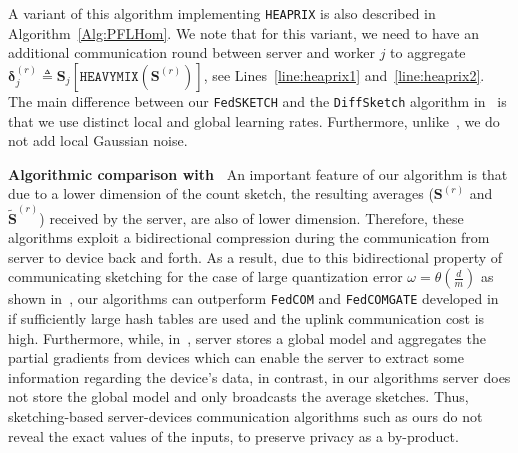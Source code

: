 \documentclass[11pt]{article}
\begin{document}
A variant of this algorithm implementing \texttt{HEAPRIX} is also described in Algorithm~\ref{Alg:PFLHom}. 
We note that for this variant, we need to have an additional communication round between server and worker $j$ to aggregate $\mathbf{\delta}_j^{(r)}\triangleq \mathbf{S}_j\left[\texttt{HEAVYMIX}(\mathbf{S}^{(r)})\right]$, see Lines~\ref{line:heaprix1} and~\ref{line:heaprix2}. The main difference between our \texttt{FedSKETCH} and the \texttt{DiffSketch} algorithm in~\citet{li2019privacy} is that we use distinct local and global learning rates. Furthermore, unlike~\citet{li2019privacy}, we do not add local Gaussian noise. 




\noindent\textbf{Algorithmic comparison  with~\citet{haddadpour2020federated}}
An important feature of our algorithm is that due to a lower dimension of the count sketch, the resulting averages ($\mathbf{S}^{(r)}$ and  $\tilde{\mathbf{S}}^{(r)}$) received by the server, are also of lower dimension. 
Therefore, these algorithms exploit a bidirectional compression during the communication from server to device back and forth. 
As a result, due to this bidirectional property of communicating sketching for the case of large quantization error $\omega=\theta(\frac{d}{m})$ as shown in~\citet{haddadpour2020federated}, our algorithms can outperform \texttt{FedCOM} and \texttt{FedCOMGATE} developed in~\citet{haddadpour2020federated} if sufficiently large hash tables are used and the uplink communication cost is high. 
Furthermore, while, in~\citet{haddadpour2020federated}, server stores a global model and aggregates the partial gradients from devices which can enable the server to extract some information regarding the device's data, in contrast, in our algorithms server does not store the global model and only broadcasts the average sketches. 
Thus, sketching-based server-devices communication algorithms such as ours do not reveal the exact values of the inputs, to preserve privacy as a by-product.
\end{document}
